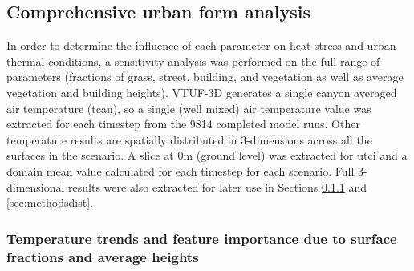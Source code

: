 \documentclass[final,3p,times,authoryear]{elsarticle}
\begin{document}
\subsection{Comprehensive urban form analysis}\label{sec:methodsparam}


In order to determine the influence of each parameter on heat stress and urban thermal conditions, a sensitivity analysis was performed on the full range of parameters (fractions of grass, street, building, and vegetation as well as average vegetation and building heights). VTUF-3D generates a single canyon averaged air temperature (\gls{tcan}), so a single (well mixed) air temperature value was extracted for each timestep from the 9814 completed model runs. Other temperature results are spatially distributed in 3-dimensions across all the surfaces in the scenario. A slice at 0m (ground level) was extracted for \gls{utci} and a domain mean value calculated for each timestep for each scenario. Full 3-dimensional results were also extracted for later use in Sections \ref{sec:methodstempvspercent} and \ref{sec:methodsdist}.



%

\subsubsection{Temperature trends and feature importance due to surface fractions and average heights}\label{sec:methodstempvspercent}
\end{document}
